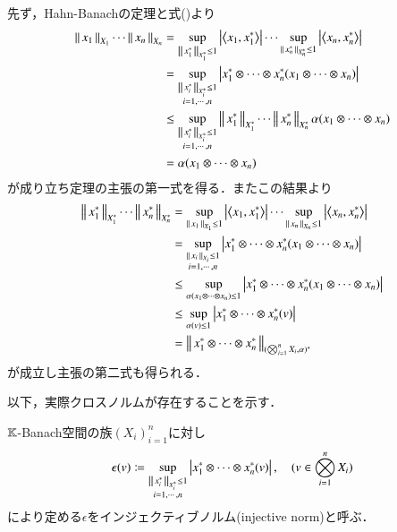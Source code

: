 	\begin{prf}
		先ず，Hahn-Banachの定理と式()より
		\begin{align}
			\Norm{x_1}{X_1} \cdots \Norm{x_n}{X_n} 
			&= \sup{\Norm{x_1^*}{X_1^*} \leq 1}{\left| \inprod<x_1,x_1^*> \right|} 
				\cdots \sup{\Norm{x_n^*}{X_n^*} \leq 1}{\left| \inprod<x_n,x_n^*> \right|} \\
			&= \sup{\substack{\Norm{x_i^*}{X_i^*} \leq 1 \\ i=1,\cdots,n}}{\left| x_1^* \otimes \cdots \otimes x_n^* (x_1 \otimes \cdots \otimes x_n) \right|} \\
			&\leq \sup{\substack{\Norm{x_i^*}{X_i^*} \leq 1 \\ i=1,\cdots,n}}{\Norm{x_1^*}{X_1^*} \cdots \Norm{x_n^*}{X_n^*}}\alpha(x_1 \otimes \cdots \otimes x_n) \\
			&= \alpha(x_1 \otimes \cdots \otimes x_n)
		\end{align}
		が成り立ち定理の主張の第一式を得る．またこの結果より
		\begin{align}
			\Norm{x_1^*}{X_1^*} \cdots \Norm{x_n^*}{X_n^*} 
			&= \sup{\Norm{x_1}{X_1} \leq 1}{\left| \inprod<x_1,x_1^*> \right|}
				\cdots \sup{\Norm{x_n}{X_n} \leq 1}{\left| \inprod<x_n,x_n^*> \right|} \\
			&= \sup{\substack{\Norm{x_i}{X_i} \leq 1 \\ i=1,\cdots,n}}{\left| x_1^* \otimes \cdots \otimes x_n^* (x_1 \otimes \cdots \otimes x_n) \right|} \\
			&\leq \sup{\alpha(x_1 \otimes \cdots \otimes x_n) \leq 1}{\left| x_1^* \otimes \cdots \otimes x_n^* (x_1 \otimes \cdots \otimes x_n) \right|} \\
			&\leq \sup{\alpha(v) \leq 1}{\left| x_1^* \otimes \cdots \otimes x_n^* (v) \right|} \\
			&= \Norm{x_1^* \otimes \cdots \otimes x_n^*}{(\bigotimes_{i=1}^n X_i, \alpha)^*}
		\end{align}
		が成立し主張の第二式も得られる．
		\QED
	\end{prf}
	
	以下，実際クロスノルムが存在することを示す．
	\begin{screen}
		\begin{dfn}[インジェクティブノルム]
			$\mathbb{K}$-Banach空間の族$(X_i)_{i=1}^n$に対し
			\begin{align}
				\epsilon(v) \coloneqq
				\operatorname*{sup}_{\substack{\left\|\, x_i^*\, \right\|_{X_i^*}\leq 1 \\ i=1,\cdots,n}} \left| x_1^* \otimes \cdots \otimes x_n^* (v) \right|,
				\quad (v \in \bigotimes_{i=1}^n X_i)
			\end{align}
			により定める$\epsilon$をインジェクティブノルム(injective norm)と呼ぶ．
		\end{dfn}
	\end{screen}
	
